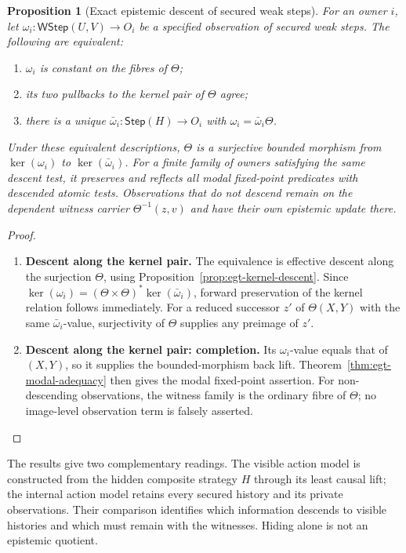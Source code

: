 \documentclass[11pt,a4paper]{article}
\numberwithin{equation}{section}
\newtheorem{proposition}[theorem]{Proposition}
\theoremstyle{definition}
\theoremstyle{remark}
\theoremstyle{plain}
\begin{document}
\begin{proposition}[Exact epistemic descent of secured weak steps]
\label{prop:egt-secured-action-descent}
For an owner $i$, let
$\omega_i:\mathsf{WStep}(U,V)\to O_i$ be a specified observation of
secured weak steps. The following are equivalent:
\begin{enumerate}[label=\textup{(\roman*)},leftmargin=*]
\item $\omega_i$ is constant on the fibres of $\Theta$;
\item its two pullbacks to the kernel pair of $\Theta$ agree;
\item there is a unique $\bar\omega_i:\mathsf{Step}(H)\to O_i$
with $\omega_i=\bar\omega_i\Theta$.
\end{enumerate}
Under these equivalent descriptions, $\Theta$ is a surjective bounded
morphism from $\ker(\omega_i)$ to $\ker(\bar\omega_i)$. For a finite
family of owners satisfying the same descent test, it preserves and
reflects all modal fixed-point predicates with descended atomic tests.
Observations that do not descend remain on the dependent witness carrier
$\Theta^{-1}(z,v)$ and have their own epistemic update there.
\end{proposition}
\begin{proof}
\leavevmode
\begin{enumerate}[label=\textup{(\arabic*)},leftmargin=*,itemsep=4pt,topsep=3pt]
  \item \textbf{Descent along the kernel pair.} The equivalence is effective descent along the surjection $\Theta$,
using Proposition~\ref{prop:egt-kernel-descent}. Since
$\ker(\omega_i)=(\Theta\times\Theta)^*\ker(\bar\omega_i)$,
forward preservation of the kernel relation follows immediately. For a reduced successor $z'$ of $\Theta(X,Y)$ with the same
$\bar\omega_i$-value, surjectivity of $\Theta$ supplies any preimage
of $z'$.
  \item \textbf{Descent along the kernel pair: completion.} Its $\omega_i$-value equals that of $(X,Y)$, so it supplies
the bounded-morphism back lift. Theorem~\ref{thm:egt-modal-adequacy}
then gives the modal fixed-point assertion. For non-descending
observations, the witness family is the ordinary fibre of $\Theta$;
no image-level observation term is falsely asserted.
\end{enumerate}
\end{proof}

The results give two complementary readings. The visible action
model is constructed from the hidden composite strategy $H$ through
its least causal lift; the internal action model retains every secured
history and its private observations. Their comparison identifies
which information descends to visible histories and which must remain
with the witnesses. Hiding alone is not an epistemic quotient.
\end{document}
